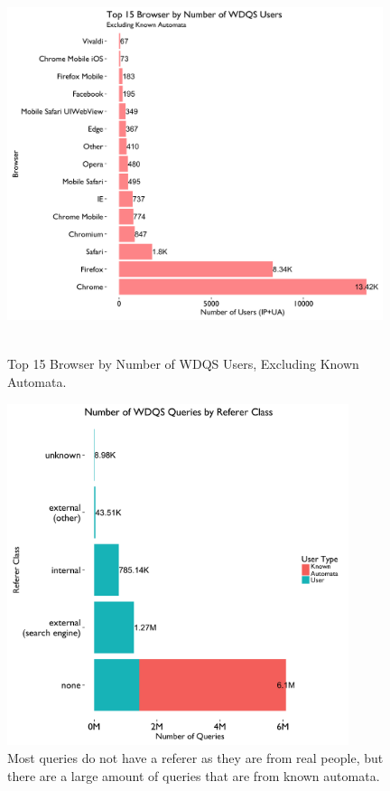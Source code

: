 \documentclass[12pt,]{article}
\begin{document}
\begin{figure}[H]
\centering
\includegraphics[width=11cm,height=11cm,keepaspectratio]{figures/n_user_by_browser.png}
\caption{Top 15 Browser by Number of WDQS Users, Excluding Known
Automata.}
\end{figure}

\begin{figure}[H]
\centering
\includegraphics[width=10cm,height=10cm,keepaspectratio]{figures/n_query_by_referer_class.png}
\caption{Most queries do not have a referer as they are from real
people, but there are a large amount of queries that are from known automata.}
\end{figure}
\end{document}
